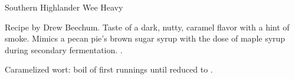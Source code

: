 \begin{recipe}{Southern Highlander Wee Heavy} %

\begin{aboutblock}
Recipe by Drew Beechum. Taste of a dark, nutty, caramel flavor with a hint of smoke.
Mimics a pecan pie's brown sugar syrup with the dose of maple syrup during secondary
fermentation. .
\end{aboutblock}


\begin{methodandtiming}

\begin{mashsteps}
\end{mashsteps}

\begin{directions}
Caramelized wort: boil  of first runnings until reduced to .
\end{directions}

\end{methodandtiming}

\recipebreak

\begin{ingredientsblock}

\begin{malts}
\end{malts}

\begin{hops}
\end{hops}


\begin{twists}
\end{twists}

\end{ingredientsblock}

\end{recipe}

